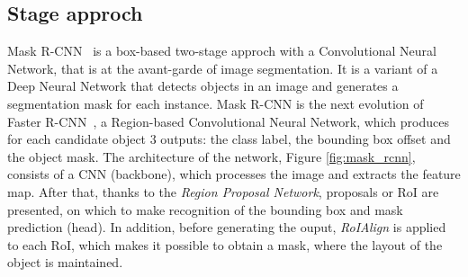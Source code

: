 \documentclass[10pt,twocolumn,letterpaper]{article}
\begin{document}
\subsection{Stage approch} 
Mask R-CNN~\cite{Authors1_maskrcnn} is a box-based two-stage approch with a Convolutional Neural Network, that is at the avant-garde of image segmentation. It is a variant of a Deep Neural Network that detects objects in an image and generates a segmentation mask for each instance. Mask R-CNN is the next evolution of Faster R-CNN~\cite{fasterRCNN}, a Region-based Convolutional Neural Network, which produces for each candidate object 3 outputs: the class label, the bounding box offset and the object mask.
The architecture of the network, Figure \ref{fig:mask_rcnn}, consists of a CNN (backbone), which processes the image and extracts the feature map. After that, thanks to the \textit{Region Proposal Network}, proposals or RoI are presented, on which to make recognition of the bounding box and mask prediction (head). In addition, before generating the ouput, \textit{RoIAlign} is applied to each RoI, which makes it possible to obtain a mask, where the layout of the object is maintained.
\end{document}
